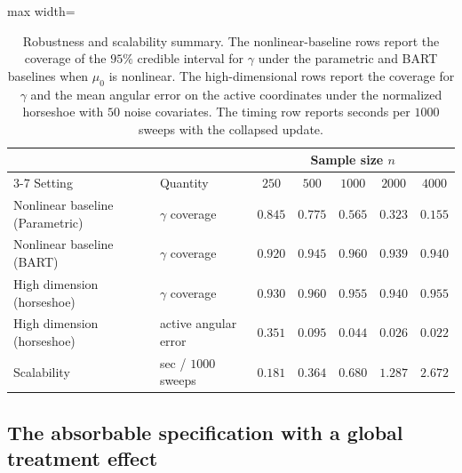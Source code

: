 \documentclass[11pt]{article}
\theoremstyle{definition}
\theoremstyle{plain}
\begin{document}
\begin{table}[!htbp]
  \centering
  \caption{Robustness and scalability summary. The nonlinear-baseline rows report the coverage of the $95\%$ credible interval for $\gamma$ under the parametric and BART baselines when $\mu_0$ is nonlinear. The high-dimensional rows report the coverage for $\gamma$ and the mean angular error on the active coordinates under the normalized horseshoe with $50$ noise covariates. The timing row reports seconds per $1000$ sweeps with the collapsed update.}
  \label{tab:sim_robust_timing}
  \begin{adjustbox}{max width=\textwidth}
  \begin{tabular}{llccccc}
    \toprule
    & & \multicolumn{5}{c}{Sample size $n$}\\
    \cmidrule(lr){3-7}
    Setting & Quantity & $250$ & $500$ & $1000$ & $2000$ & $4000$\\
    \midrule
    Nonlinear baseline (Parametric) & $\gamma$ coverage & $0.845$ & $0.775$ & $0.565$ & $0.323$ & $0.155$\\
    Nonlinear baseline (BART) & $\gamma$ coverage & $0.920$ & $0.945$ & $0.960$ & $0.939$ & $0.940$\\
    High dimension (horseshoe) & $\gamma$ coverage & $0.930$ & $0.960$ & $0.955$ & $0.940$ & $0.955$\\
    High dimension (horseshoe) & active angular error & $0.351$ & $0.095$ & $0.044$ & $0.026$ & $0.022$\\
    Scalability & sec / $1000$ sweeps & $0.181$ & $0.364$ & $0.680$ & $1.287$ & $2.672$\\
    \bottomrule
  \end{tabular}
  \end{adjustbox}
\end{table}

\subsection{The absorbable specification with a global treatment effect}
\label{sec:absorbable_results}
\end{document}
